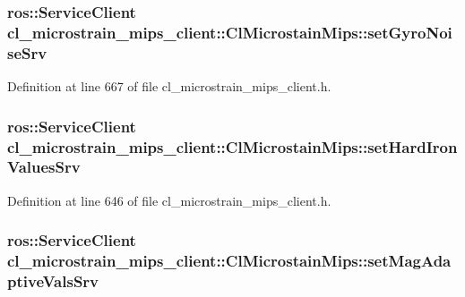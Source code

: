 \subsubsection[{\texorpdfstring{set\+Gyro\+Noise\+Srv}{setGyroNoiseSrv}}]{\setlength{\rightskip}{0pt plus 5cm}ros\+::\+Service\+Client cl\+\_\+microstrain\+\_\+mips\+\_\+client\+::\+Cl\+Microstain\+Mips\+::set\+Gyro\+Noise\+Srv\hspace{0.3cm}{\ttfamily [protected]}}\hypertarget{classcl__microstrain__mips__client_1_1ClMicrostainMips_a1aeec41e9b94e04310e260104e389c93}{}\label{classcl__microstrain__mips__client_1_1ClMicrostainMips_a1aeec41e9b94e04310e260104e389c93}


Definition at line 667 of file cl\+\_\+microstrain\+\_\+mips\+\_\+client.\+h.

\subsubsection[{\texorpdfstring{set\+Hard\+Iron\+Values\+Srv}{setHardIronValuesSrv}}]{\setlength{\rightskip}{0pt plus 5cm}ros\+::\+Service\+Client cl\+\_\+microstrain\+\_\+mips\+\_\+client\+::\+Cl\+Microstain\+Mips\+::set\+Hard\+Iron\+Values\+Srv\hspace{0.3cm}{\ttfamily [protected]}}\hypertarget{classcl__microstrain__mips__client_1_1ClMicrostainMips_ac70bd31f9656c44e6bd7e4e5cc52c3a1}{}\label{classcl__microstrain__mips__client_1_1ClMicrostainMips_ac70bd31f9656c44e6bd7e4e5cc52c3a1}


Definition at line 646 of file cl\+\_\+microstrain\+\_\+mips\+\_\+client.\+h.

\subsubsection[{\texorpdfstring{set\+Mag\+Adaptive\+Vals\+Srv}{setMagAdaptiveValsSrv}}]{\setlength{\rightskip}{0pt plus 5cm}ros\+::\+Service\+Client cl\+\_\+microstrain\+\_\+mips\+\_\+client\+::\+Cl\+Microstain\+Mips\+::set\+Mag\+Adaptive\+Vals\+Srv\hspace{0.3cm}{\ttfamily [protected]}}\hypertarget{classcl__microstrain__mips__client_1_1ClMicrostainMips_aaa3e236c737600691cacc4e43d758ec8}{}\label{classcl__microstrain__mips__client_1_1ClMicrostainMips_aaa3e236c737600691cacc4e43d758ec8}


